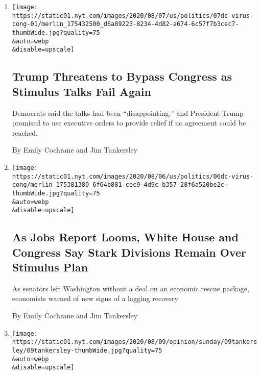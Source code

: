 \begin{enumerate}
\def\labelenumi{\arabic{enumi}.}
\item
  \href{/2020/08/07/us/politics/trump-congress-stimulus.html}{}

  \texttt{[image: https://static01.nyt.com/images/2020/08/07/us/politics/07dc-virus-cong-01/merlin\_175432500\_d6a89223-8234-4d82-a674-6c57f7b3cec7-thumbWide.jpg?quality=75\\\&auto=webp\\\&disable=upscale]}

  \hypertarget{trump-threatens-to-bypass-congress-as-stimulus-talks-fail-again}{%
  \subsection{Trump Threatens to Bypass Congress as Stimulus Talks Fail
  Again}\label{trump-threatens-to-bypass-congress-as-stimulus-talks-fail-again}}

  Democrats said the talks had been ``disappointing,'' and President
  Trump promised to use executive orders to provide relief if no
  agreement could be reached.

  By Emily Cochrane and Jim Tankersley
\item
  \href{/2020/08/06/business/coronavirus-jobs-report-trump-congress-stimulus.html}{}

  \texttt{[image: https://static01.nyt.com/images/2020/08/06/us/politics/06dc-virus-cong/merlin\_175381380\_6f64b881-cec9-4d9c-b357-28f6a520be2c-thumbWide.jpg?quality=75\\\&auto=webp\\\&disable=upscale]}

  \hypertarget{as-jobs-report-looms-white-house-and-congress-say-stark-divisions-remain-over-stimulus-plan}{%
  \subsection{As Jobs Report Looms, White House and Congress Say Stark
  Divisions Remain Over Stimulus
  Plan}\label{as-jobs-report-looms-white-house-and-congress-say-stark-divisions-remain-over-stimulus-plan}}

  As senators left Washington without a deal on an economic rescue
  package, economists warned of new signs of a lagging recovery

  By Emily Cochrane and Jim Tankersley
\item
  \href{/2020/08/06/sunday-review/middle-class-prosperity.html}{}

  \texttt{[image: https://static01.nyt.com/images/2020/08/09/opinion/sunday/09tankersley/09tankersley-thumbWide.jpg?quality=75\\\&auto=webp\\\&disable=upscale]}


\end{enumerate}
